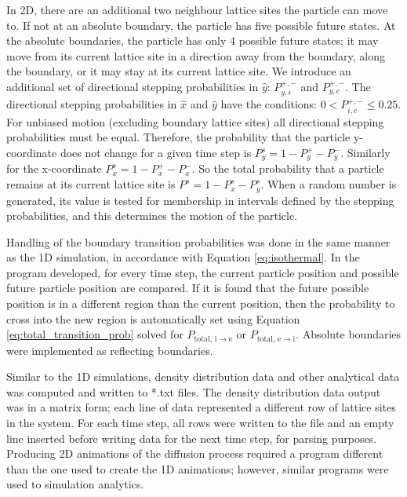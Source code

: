 	In 2D, there are an additional two neighbour lattice sites the particle can move to. If not at an absolute boundary, the particle has five possible future states. At the absolute boundaries, the particle has only 4 possible future states; it may move from its current lattice site in a direction away from the boundary, along the boundary, or it may stay at its current lattice site. We introduce an additional set of directional stepping probabilities in $ \hat{y} $: $ P_{y,i}^{+,-} $ and $ P_{y,e}^{+,-} $. The directional stepping probabilities in $ \hat{x} $ and $ \hat{y} $ have the conditions: $ 0 < P_{i,e}^{+,-} \leq 0.25 $. For unbiased motion (excluding boundary lattice sites) all directional stepping probabilities must be equal. Therefore, the probability that the particle y-coordinate does not change for a given time step is $ P_{y}^s = 1 - P_{y}^{+} - P_{y}^{-}$. Similarly for the x-coordinate $ P_{x}^s = 1 - P_{x}^{+} - P_{x}^{-}$. So the total probability that a particle remains at its current lattice site is $ P^s = 1 - P_{x}^s - P_{y}^s$. When a random number is generated, its value is tested for membership in intervals defined by the stepping probabilities, and this determines the motion of the particle.
	
	Handling of the boundary transition probabilities was done in the same manner as the 1D simulation, in accordance with Equation \ref{eq:isothermal}. In the program developed, for every time step, the current particle position and possible future particle position are compared. If it is found that the future possible position is in a different region than the current position, then the probability to cross into the new region is automatically set using Equation \ref{eq:total_transition_prob} solved for $ P_{\textrm{total},\, \textrm{i} \rightarrow \textrm{e}} $ or $ P_{\textrm{total},\, \textrm{e} \rightarrow \textrm{i}} $. Absolute boundaries were implemented as reflecting boundaries.
	
	Similar to the 1D simulations, density distribution data and other analytical data was computed and written to *.txt files. The density distribution data output was in a matrix form; each line of data represented a different row of lattice sites in the system. For each time step, all rows were written to the file and an empty line inserted before writing data for the next time step, for parsing purposes. Producing 2D animations of the diffusion process required a program different than the one used to create the 1D animations; however, similar programs were used to simulation analytics.

